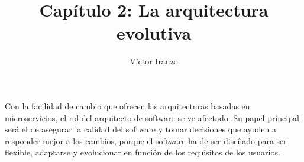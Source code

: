 \documentclass[11pt,a4paper]{article}
\author{Víctor Iranzo}
\title{Capítulo 2: La arquitectura evolutiva}
\begin{document}
\maketitle

Con la facilidad de cambio que ofrecen las arquitecturas basadas en microservicios, el rol del arquitecto de software se ve afectado. Su papel principal será el de asegurar la calidad del software y tomar decisiones que ayuden a responder mejor a los cambios, porque el software ha de ser diseñado para ser flexible, adaptarse y evolucionar en función de los requisitos de los usuarios.
\end{document}
